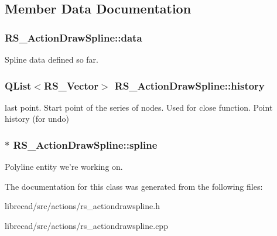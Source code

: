 \subsection{Member Data Documentation}
\hypertarget{classRS__ActionDrawSpline_ac958c421731777f66d4d7ebc3a72fd8d}{
\subsubsection[{data}]{ R\-S\-\_\-\-Action\-Draw\-Spline\-::data\hspace{0.3cm}{\ttfamily [protected]}}}\label{classRS__ActionDrawSpline_ac958c421731777f66d4d7ebc3a72fd8d}
Spline data defined so far. \hypertarget{classRS__ActionDrawSpline_ae9165efc071ea5b8c46fee97743922e8}{
\subsubsection[{history}]{\setlength{\rightskip}{0pt plus 5cm}Q\-List$<${\bf R\-S\-\_\-\-Vector}$>$ R\-S\-\_\-\-Action\-Draw\-Spline\-::history\hspace{0.3cm}{\ttfamily [protected]}}}\label{classRS__ActionDrawSpline_ae9165efc071ea5b8c46fee97743922e8}
last point. Start point of the series of nodes. Used for close function. Point history (for undo) \hypertarget{classRS__ActionDrawSpline_ad2d70b6a113c618cdd3bc50adb1a327e}{
\subsubsection[{spline}]{$\ast$ R\-S\-\_\-\-Action\-Draw\-Spline\-::spline\hspace{0.3cm}{\ttfamily [protected]}}}\label{classRS__ActionDrawSpline_ad2d70b6a113c618cdd3bc50adb1a327e}
Polyline entity we're working on. 

The documentation for this class was generated from the following files\-:\begin{DoxyCompactItemize}
\item 
librecad/src/actions/rs\-\_\-actiondrawspline.\-h\item 
librecad/src/actions/rs\-\_\-actiondrawspline.\-cpp\end{DoxyCompactItemize}
